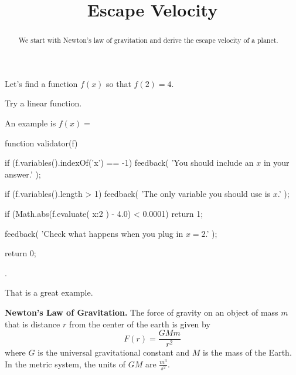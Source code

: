 \documentclass{ximera}
\title{Escape Velocity}
\begin{document}
\begin{abstract}
We start with Newton's law of gravitation and derive the escape velocity of a planet.
\end{abstract}
\maketitle


\begin{exercise}
Let's find a function $f(x)$ so that $f(2) = 4$.

\begin{solution}
\begin{hint}
Try a linear function.
\end{hint}
An example is $f(x) = $ \begin{expression-answer}
  function validator(f) {

    if (f.variables().indexOf('x') == -1) {
      feedback( 'You should include an $x$ in your answer.' );
    }

    if (f.variables().length > 1) {
      feedback( 'The only variable you should use is $x$.' );
    }

    if (Math.abs(f.evaluate( {x:2} ) - 4.0) < 0.0001) {
      return 1;
    }

    feedback( 'Check what happens when you plug in $x=2$.' );

    return 0;
  }
\end{expression-answer}.
\end{solution}

That is a great example.
\end{exercise}


\begin{observation}
\textbf{Newton's Law of Gravitation.} The force of gravity on an object of mass $m$ that is distance $r$ from the center of the earth is given by
$$ F(r) = \frac{G M m}{r^2}$$
where $G$ is the universal gravitational constant and $M$ is the mass of the Earth. In the metric system, the units of $G M$ are $\frac{m^3}{s^2}$.
\end{observation}
\end{document}
